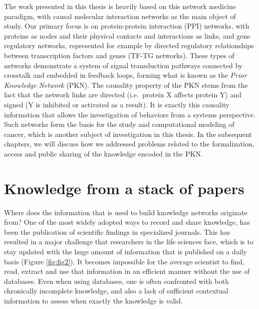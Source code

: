 \documentclass[
  12pt,
]{book}
\begin{document}
The work presented in this thesis is heavily based on this network medicine paradigm, with causal molecular interaction networks as the main object of study.
Our primary focus is on protein-protein interaction (PPI) networks, with proteins as nodes and their physical contacts and interactions as links, and gene regulatory networks, represented for example by directed regulatory relationships between transcription factors and genes (TF-TG networks).
These types of networks demonstrate a system of signal transduction pathways connected by crosstalk and embedded in feedback loops, forming what is known as the \emph{Prior Knowledge Network} (PKN).
The causality property of the PKN stems from the fact that the network links are directed (i.e.~protein X affects protein Y) and signed (Y is inhibited or activated as a result).
It is exactly this causality information that allows the investigation of behaviors from a systems perspective.
Such networks form the basis for the study and computational modeling of cancer, which is another subject of investigation in this thesis.
In the subsequent chapters, we will discuss how we addressed problems related to the formalization, access and public sharing of the knowledge encoded in the PKN.

\newpage

\hypertarget{knowledge-from-a-stack-of-papers}{%
\section*{Knowledge from a stack of papers}\label{knowledge-from-a-stack-of-papers}}

\indent

Where does the information that is used to build knowledge networks originate from?
One of the most widely adopted ways to record and share knowledge, has been the publication of scientific findings in specialized journals.
This has resulted in a major challenge that researchers in the life sciences face, which is to stay updated with the huge amount of information that is published on a daily basis (Figure \ref{fig:fig2}).
It becomes impossible for the average scientist to find, read, extract and use that information in an efficient manner without the use of databases.
Even when using databases, one is often confronted with both chronically incomplete knowledge, and also a lack of sufficient contextual information to assess when exactly the knowledge is valid.
\end{document}
